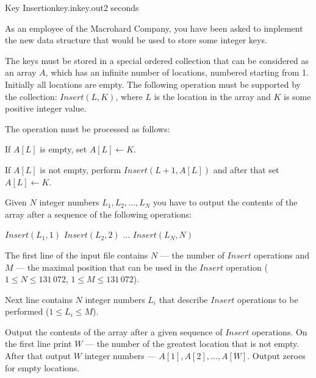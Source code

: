 \begin{problem}{Key Insertion}{key.in}{key.out}{2 seconds}

As an employee of the Macrohard
Company, you have been asked to implement the new data structure
that would be used to store some integer keys. 

The keys must be stored in a special ordered collection that can be considered as an array $A$,
which has an infinite number of locations, numbered starting from 1. 
Initially all locations are empty. The following operation must be supported by the collection: 
$Insert(L, K)$, where $L$ is the location in the array and $K$ is some positive integer value.

The operation must be processed as follows:

\begin{shortitems}
    \item If $A[L]$ is empty, set $A[L] \gets K$.
    \item If $A[L]$ is not empty, perform $Insert(L+1, A[L])$ and after that set $A[L] \gets K$.
\end{shortitems}

Given $N$ integer numbers $L_1, L_2, \ldots, L_N$ you have to output the
contents of the array after a sequence of the following operations:

{\obeylines\setlength{\parindent}{6mm}\parskip=0mm
$Insert(L_1, 1)$
$Insert(L_2, 2)$
$\dots$
$Insert(L_N, N)$
}


\InputFile

The first line of the input file contains $N$ --- the number of $Insert$ operations
and $M$ --- the maximal position that can be used in the $Insert$ operation ($1 \le N \le 131\,072$,
$1 \le M \le 131\,072$).

Next line contains $N$ integer numbers $L_i$ that describe $Insert$ operations to be performed
($1 \le L_i \le M$).

\OutputFile

Output the contents of the array after a given sequence of $Insert$ operations.
On the first line print $W$ --- the number of the greatest location that is not empty.
After that output $W$ integer numbers --- $A[1], A[2], \ldots, A[W]$. Output zeroes
for empty locations.

\Example

\begin{example}[*]
%
\end{example}

\end{problem}
